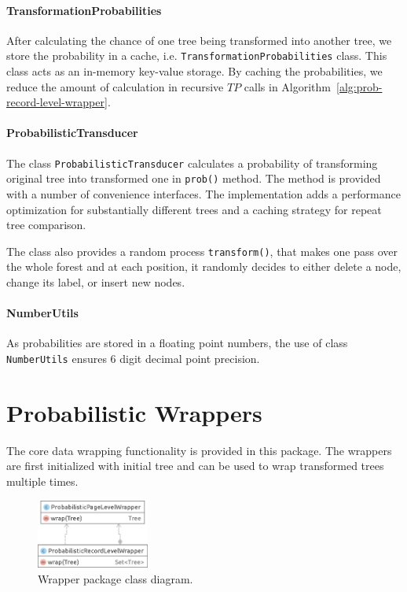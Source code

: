\paragraph{TransformationProbabilities} After calculating the chance of one tree being transformed into another tree, we store the probability in a cache, i.e. \texttt{TransformationProbabilities} class. This class acts as an in-memory key-value storage. By caching the probabilities, we reduce the amount of calculation in recursive $TP$ calls in Algorithm~\ref{alg:prob-record-level-wrapper}.

\paragraph{ProbabilisticTransducer} The class \texttt{ProbabilisticTransducer} calculates a probability of transforming original tree into transformed one in \texttt{prob()} method. The method is provided with a number of convenience interfaces. The implementation adds a performance optimization for substantially different trees and a caching strategy for repeat tree comparison.

The class also provides a random process \texttt{transform()}, that makes one pass over the whole forest and at each position, it randomly decides to either delete a node, change its label, or insert new nodes.

\paragraph{NumberUtils} As probabilities are stored in a floating point numbers, the use of class \texttt{NumberUtils} ensures 6 digit decimal point precision.


\section{Probabilistic Wrappers}

The core data wrapping functionality is provided in this package. The wrappers are first initialized with initial tree and can be used to wrap transformed trees multiple times.

\begin{figure}[h]
	\centering
	\includegraphics[width=0.33\textwidth]{figures/package-wrapper}
	\caption{Wrapper package class diagram.}
	\label{fig:package-wrapper}
\end{figure}

